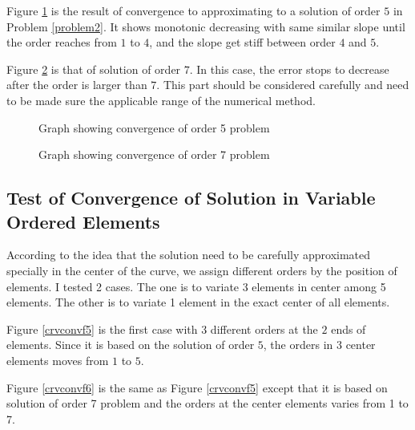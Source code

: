 Figure \ref{crvconvf3} is the result of convergence to
approximating to a solution of order $5$ in Problem
\ref{problem2}. It shows monotonic decreasing with same similar
slope until the order reaches from $1$ to $4$, and the slope get
stiff between order $4$ and $5$.

Figure \ref{crvconvf4} is that of solution of order $7$. In this
case, the error stops to decrease after the order is larger than
$7$. This part should be considered carefully and need to be made
sure the applicable range of the numerical method.

\begin{figure}[h]
\begin{center}
\caption{\label{crvconvf3}Graph showing convergence of order 5
problem}
\end{center}
\end{figure}

\begin{figure}[h]
\begin{center}
\caption{\label{crvconvf4}Graph showing convergence of order 7
problem}
\end{center}
\end{figure}



\subsection{Test of Convergence of Solution in Variable Ordered Elements}

According to the idea that the solution need to be carefully
approximated specially in the center of the curve, we assign
different orders by the position of elements. I tested 2 cases.
The one is to variate 3 elements in center among 5 elements. The
other is to variate 1 element in the exact center of all elements.

Figure \ref{crvconvf5} is the first case with 3 different orders
at the $2$ ends of elements. Since it is based on the solution of
order $5$, the orders in 3 center elements moves from $1$ to $5$.

Figure \ref{crvconvf6} is the same as Figure \ref{crvconvf5}
except that it is based on solution of order 7 problem and the
orders at the center elements varies from 1 to 7.


